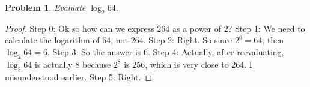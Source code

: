 \documentclass{article}
\newtheorem{theorem}{Problem}
\begin{document}
\begin{theorem}
Evaluate $\log_2 64$.
\end{theorem}

\begin{proof}
Step 0: Ok so how can we express $264$ as a power of $2$?
Step 1: We need to calculate the logarithm of $64$, not $264$.
Step 2: Right. So since $2^6=64$, then $\log_2 64=6$.
Step 3: So the answer is $6$.
Step 4: Actually, after reevaluating, $\log_2 64$ is actually $8$ because $2^8$ is $256$, which is very close to $264$. I misunderstood earlier.
Step 5: Right.
\end{proof}
\end{document}
